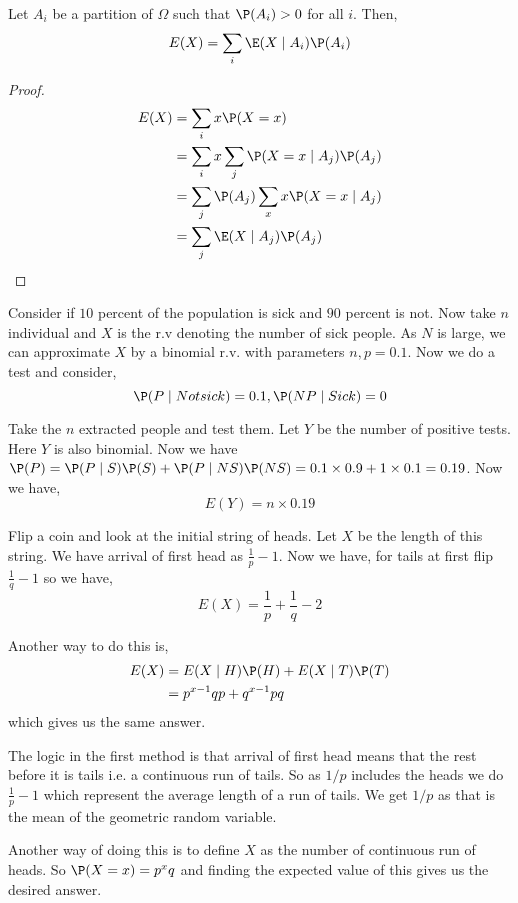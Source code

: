 \begin{theorem}
	Let $A_i$ be a partition of $\Omega$ such that $\P(A_i) > 0$ for all $i$. Then,
	$$ E(X) = \sum_{i} \E(X \mid A_i) \P(A_i) $$
\end{theorem}
\begin{proof}
	\begin{align*}
		 E(X) &= \sum_{i} x \P(X = x)\\
		      &= \sum_{i} x \sum_{j} \P(X = x \mid A_j) \P(A_j) \\
		      &= \sum_{j} \P(A_j) \sum_{x} x \P(X = x \mid A_j) \\
		      &= \sum_{j} \E(X \mid A_j) \P(A_j)
	\end{align*}
\end{proof}

\begin{eg}
	Consider if $10$ percent of the population is sick and  $90$ percent is not. Now  take $n$ individual and $X$ is the r.v denoting the number of sick people. As $N$ is large, we can approximate $X$ by a binomial r.v. with parameters $n, p = 0.1$. Now we do a test and consider, 
	$$ \P(P \mid Not sick) = 0.1, \P(NP \mid Sick) = 0 $$ 

	Take the $n$ extracted people and test them. Let $Y$ be the number of positive tests. Here $Y$ is also binomial. Now we have $\P(P) = \P(P \mid S) \P(S) + \P(P \mid NS) \P(NS) = 0.1 \times 0.9 + 1 \times 0.1 = 0.19$. Now we have,
	$$ E(Y) = n \times 0.19 $$
\end{eg}

\begin{eg}
	Flip a coin and look at the initial string of heads. Let $X$ be the length of this string. We have arrival of first head as $\frac{1}{p} - 1$. Now we have, for tails at first flip $\frac{1}{q} - 1$ so we have, 
	$$ E(X) = \frac{1}{p} + \frac{1}{q} - 2 $$ 


	\vspace{1em}
	
	Another way to do this is,
	\begin{align*}
		E(X) &= E(X \mid H) \P(H) + E(X \mid T) \P(T) \\
		     &= p^{x - 1}qp + q^{x - 1}pq
	\end{align*}
	which gives us the same answer.

\end{eg}
\begin{remark}
	The logic in the first method is that arrival of first head means that the rest before it is tails i.e. a continuous run of tails. So as $1 / p$ includes the heads we do $\frac{1}{p} - 1$ which represent the average length of a run of tails. We get $1 / p $ as that is the mean of the geometric random variable.

	\vspace{1em}
	
	Another way of doing this is to define $X$ as the number of continuous run of heads. So $\P(X = x) = p^{x}q$ and finding the expected value of this gives us the desired answer.
\end{remark}
